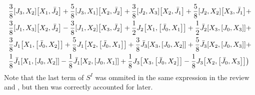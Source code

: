 \documentclass[12pt]{article}
\numberwithin{equation}{section}
\begin{document}
{\begin{align}
									  & \frac{3}{8} \comm{J_3}{X_2}\comm{X_1}{\bar{J}_2} + \frac{5}{8} \comm{J_3}{X_1} \comm{X_2}{\bar{J}_2} + \frac{3}{8}\comm{J_2}{X_3} \comm{X_2}{\bar{J}_1} + \frac{5}{8} \comm{J_2}{X_2}\comm{X_3}{\bar{J}_1} + \nonumber \\
									  &\frac{3}{8} \comm{J_1}{X_3}\comm{X_2}{\bar{J}_2} - \frac{3}{8}\comm{J_1}{X_2}\comm{X_3}{\bar{J}_2} + \frac{1}{2} J_2 \comm{X_1}{\comm{\bar{J}_0}{X_1}} + \frac{1}{2} \bar{J}_2 \comm{X_3}{\comm{J_0}{X_3}} + \nonumber \\
									  & \frac{3}{8} J_1 \comm{X_1}{\comm{\bar{J}_0}{X_2}} + \frac{5}{8} J_1 \comm{X_2}{\comm{\bar{J}_0}{X_1}} + \frac{3}{8} \bar{J}_3 \comm{X_3}{\comm{J_0}{X_2}} + \frac{5}{8} \bar{J}_3 \comm{X_2}{\comm{J_0}{X_3}} + \nonumber \\
									  & \frac{1}{8} \bar{J}_1 \comm{X_1}{\comm{J_0}{X_2}} - \frac{1}{8} \bar{J}_1 \comm{X_2}{\comm{J_0}{X_1}} + \frac{1}{8} J_3 \comm{X_3}{\comm{\bar{J}_0}{X_2}} - \frac{1}{8} J_3 \comm{X_2}{\comm{\bar{J}_0}{X_3}} \big)
\label{exp1}
\end{align}
}
Note that the last term of $S^I$ was ommited in the same expression in the review \cite{Mazzucato:2011jt} and \cite{Mazzucato:2009fv}, but then was correctly accounted for later.
\end{document}
